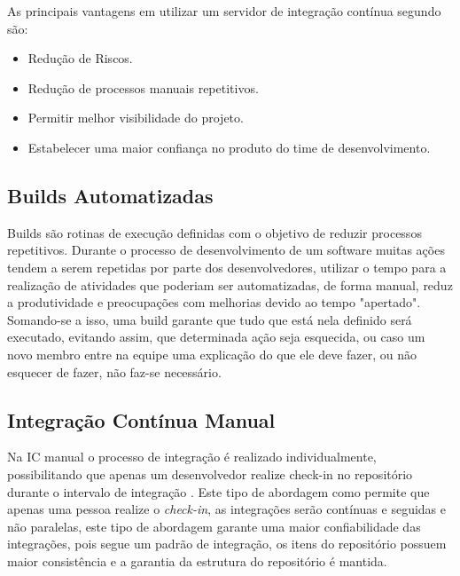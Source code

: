 As principais vantagens em utilizar um servidor de integração contínua segundo  são:

\begin{itemize}
\item Redução de Riscos.
\item Redução de processos manuais repetitivos.
\item Permitir melhor visibilidade do projeto.
\item Estabelecer uma maior confiança no produto do time de desenvolvimento.
\end{itemize}

\subsection{Builds Automatizadas}
Builds são rotinas de execução definidas com o objetivo de reduzir processos repetitivos. Durante o processo de desenvolvimento de um software muitas ações tendem a serem repetidas por parte dos desenvolvedores, utilizar o tempo para a realização  de atividades que poderiam ser automatizadas, de forma manual, reduz a produtividade e preocupações com melhorias devido ao tempo "apertado". Somando-se a isso, uma build garante que tudo que está nela definido será executado, evitando assim, que determinada ação seja esquecida, ou caso um novo membro entre na equipe uma explicação do que ele deve fazer, ou não esquecer de fazer, não faz-se necessário.

\subsection{Integração Contínua Manual}
Na IC manual o processo de integração é realizado individualmente, possibilitando que 
apenas um desenvolvedor realize check-in no repositório durante o intervalo de integração . Este tipo de abordagem como permite que apenas uma pessoa realize o \textit{check-in}, as integrações serão contínuas e seguidas e não paralelas, este tipo de abordagem garante uma maior confiabilidade das integrações, pois segue um padrão de integração, os itens do repositório possuem maior consistência e a garantia da estrutura do repositório é mantida. \cite{gleiph2011}

